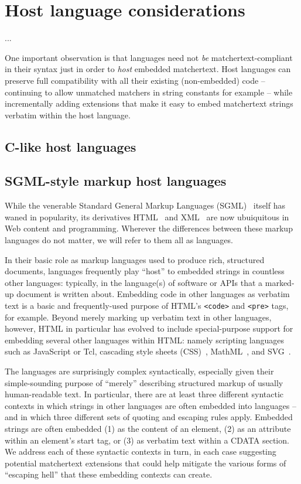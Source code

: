 \section{Host language considerations}
\label{sec:host}

...

One important observation is that
languages need not \emph{be} matchertext-compliant in their syntax
just in order to \emph{host} embedded matchertext.
Host languages can preserve full compatibility
with all their existing (non-embedded) code --
continuing to allow unmatched matchers in string constants for example --
while incrementally adding extensions that make it easy
to embed matchertext strings verbatim within the host language.


\subsection{C-like host languages}


\subsection{SGML-style markup host languages}

While the venerable
Standard General Markup Languages (SGML)~\cite{iso8879sgml}
itself has waned in popularity,
its derivatives HTML~\cite{whatwg22html} and XML~\cite{w3c08xml}
are now ubuiquitous in Web content and programming.
Wherever the differences between these markup languages do not matter,
we will refer to them all as \ml languages.

In their basic role as markup languages
used to produce rich, structured documents,
\ml languages frequently play ``host'' to embedded strings
in countless other languages:
typically, in the language(s) of software or APIs
that a marked-up document is written about.
Embedding code in other languages as verbatim text
is a basic and frequently-used purpose of HTML's
\verb|<code>| and \verb|<pre>| tags,
for example.
Beyond merely marking up verbatim text in other languages, however,
HTML in particular has evolved to include special-purpose support
for embedding several other languages within HTML:
namely scripting languages such as JavaScript or Tcl,
cascading style sheets (CSS)~\cite{XXX},
MathML~\cite{XXX},
and SVG~\cite{XXX}.

The \ml languages are surprisingly complex syntactically,
especially given their simple-sounding purpose
of ``merely'' describing structured markup of usually human-readable text.
In particular,
there are at least three different syntactic contexts
in which strings in other languages are often embedded
into \ml languages --
and in which three different sets of quoting and escaping rules apply.
Embedded strings are often embedded
(1) as the content of an element,
(2) as an attribute within an element's start tag, or
(3) as verbatim text within a CDATA section.
We address each of these syntactic contexts in turn,
in each case suggesting potential matchertext extensions
that could help mitigate the various forms of ``escaping hell''
that these embedding contexts can create.

